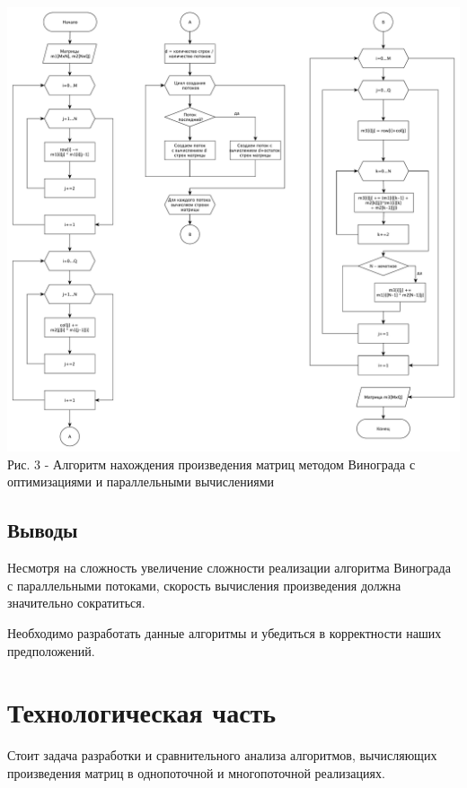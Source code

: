 \documentclass[a4paper,14pt]{article} %
\begin{document}
	\begin{center}
        		\includegraphics[scale = 0.4]{shema2} \\ Рис. 3 - Алгоритм нахождения произведения матриц методом Винограда с оптимизациями и параллельными вычислениями
	\end{center}
	
	\hfill
	
	\subsection{Выводы}
	\hfill
	
	Несмотря на сложность увеличение сложности реализации алгоритма Винограда с параллельными потоками, скорость вычисления произведения должна значительно сократиться. 
	
	Необходимо разработать данные алгоритмы и убедиться в корректности наших предположений. 
	
    	\newpage

        \section{Технологическая часть}
        \hfill
        
        Стоит задача разработки и сравнительного анализа алгоритмов, вычисляющих произведения матриц в однопоточной и многопоточной реализациях. 
        \hfill
        
\end{document}
